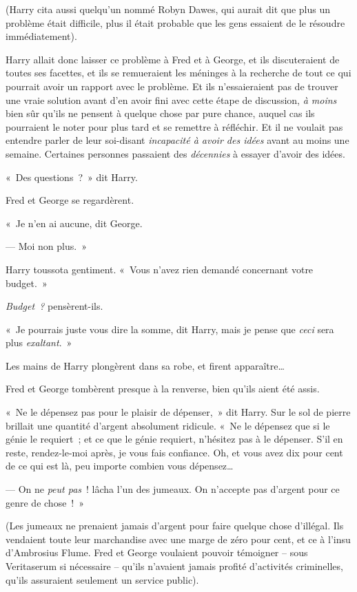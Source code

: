 (Harry cita aussi quelqu'un nommé Robyn Dawes, qui aurait dit que plus un problème était difficile, plus il était probable que les gens essaient de le résoudre immédiatement).

Harry allait donc laisser ce problème à Fred et à George, et ils discuteraient de toutes ses facettes, et ils se remueraient les méninges à la recherche de tout ce qui pourrait avoir un rapport avec le problème. Et ils n'essaieraient pas de trouver une vraie solution avant d'en avoir fini avec cette étape de discussion, \emph{à moins} bien sûr qu'ils ne pensent à quelque chose par pure chance, auquel cas ils pourraient le noter pour plus tard et se remettre à réfléchir. Et il ne voulait pas entendre parler de leur soi-disant \emph{incapacité à avoir des idées} avant au moins une semaine. Certaines personnes passaient des \emph{décennies} à essayer d'avoir des idées.

«~Des questions~?~» dit Harry.

Fred et George se regardèrent.

«~Je n'en ai aucune, dit George.

--- Moi non plus.~»

Harry toussota gentiment. «~Vous n'avez rien demandé concernant votre budget.~»

\emph{Budget~?} pensèrent-ils.

«~Je pourrais juste vous dire la somme, dit Harry, mais je pense que \emph{ceci} sera plus \emph{exaltant}.~»

Les mains de Harry plongèrent dans sa robe, et firent apparaître…

Fred et George tombèrent presque à la renverse, bien qu'ils aient été assis.

«~Ne le dépensez pas pour le plaisir de dépenser,~» dit Harry. Sur le sol de pierre brillait une quantité d'argent absolument ridicule. «~Ne le dépensez que si le génie le requiert~; et ce que le génie requiert, n'hésitez pas à le dépenser. S'il en reste, rendez-le-moi après, je vous fais confiance. Oh, et vous avez dix pour cent de ce qui est là, peu importe combien vous dépensez…

--- On ne \emph{peut pas}~! lâcha l'un des jumeaux. On n'accepte pas d'argent pour ce genre de chose~!~»

(Les jumeaux ne prenaient jamais d'argent pour faire quelque chose d'illégal. Ils vendaient toute leur marchandise avec une marge de zéro pour cent, et ce à l'insu d'Ambrosius Flume. Fred et George voulaient pouvoir témoigner -- sous Veritaserum si nécessaire -- qu'ils n'avaient jamais profité d'activités criminelles, qu'ils assuraient seulement un service public).


